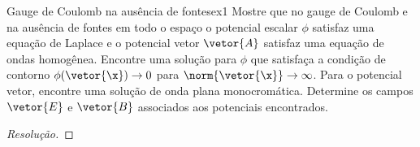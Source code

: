 \begin{exercício}{Gauge de Coulomb na ausência de fontes}{ex1}
   Mostre que no gauge de Coulomb e na ausência de fontes em todo o espaço o potencial escalar \(\phi\) satisfaz uma equação de Laplace e o potencial vetor \(\vetor{A}\) satisfaz uma equação de ondas homogênea. Encontre uma solução para \(\phi\) que satisfaça a condição de contorno \(\phi(\vetor{\x}) \to 0\) para \(\norm{\vetor{\x}} \to \infty\). Para o potencial vetor, encontre uma solução de onda plana monocromática. Determine os campos \(\vetor{E}\) e \(\vetor{B}\) associados aos potenciais encontrados.
\end{exercício}
\begin{proof}[Resolução]
    
\end{proof}
